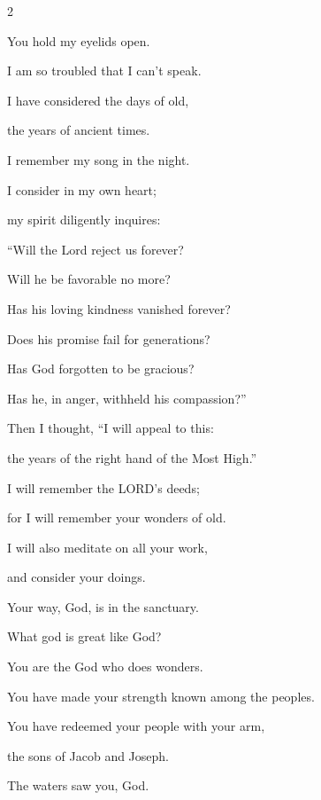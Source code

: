 \begin{multicols}{2}
	\vspace{\baselineskip}
	
	
	
	\myverse{}You hold my eyelids open.
	
	I am so troubled that I can’t speak.
	
	
	\myverse{}I have considered the days of old,
	
	the years of ancient times.
	
	
	\myverse{}I remember my song in the night.
	
	I consider in my own heart;
	
	my spirit diligently inquires:
	
	
	\myverse{}“Will the Lord reject us forever?
	
	Will he be favorable no more?
	
	
	\myverse{}Has his loving kindness vanished forever?
	
	Does his promise fail for generations?
	
	
	\myverse{}Has God forgotten to be gracious?
	
	Has he, in anger, withheld his compassion?”
	
	\vspace{\baselineskip}
	
	
	\myverse{}Then I thought, “I will appeal to this:
	
	the years of the right hand of the Most High.”
	
	
	\myverse{}I will remember the LORD’s deeds;
	
	for I will remember your wonders of old.
	
	
	\myverse{}I will also meditate on all your work,
	
	and consider your doings.
	
	
	\myverse{}Your way, God, is in the sanctuary.
	
	What god is great like God?
	
	
	\myverse{}You are the God who does wonders.
	
	You have made your strength known among the peoples.
	
	
	\myverse{}You have redeemed your people with your arm,
	
	the sons of Jacob and Joseph.
	
	\vspace{\baselineskip}
	
	
	\myverse{}The waters saw you, God.
	

\end{multicols}
